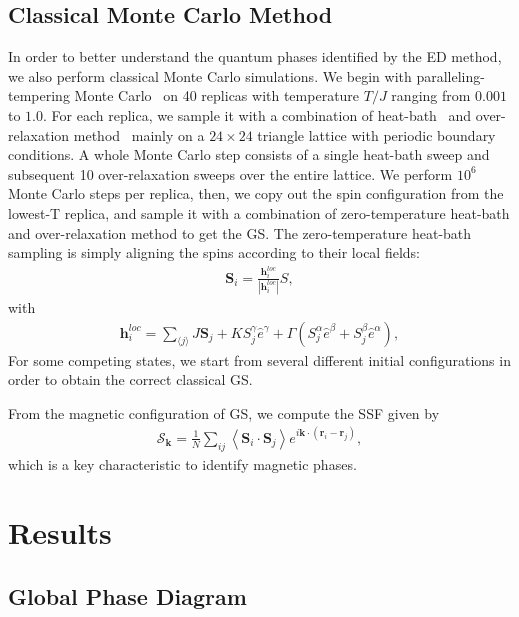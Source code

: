 \documentclass[aps,prb,reprint,amsfonts,amsmath,amssymb,showpacs,groupedaddress,superscriptaddress]{revtex4-1}
\begin{document}
\subsection{\label{subsec:MethodMC}Classical Monte Carlo Method}

In order to better understand the quantum phases identified by the ED method, we also perform classical Monte Carlo simulations. We begin with paralleling-tempering Monte Carlo~\cite{Hukushima96} on 40 replicas with temperature $T/J$ ranging from $0.001$ to $1.0$. For each replica, we sample it with a combination of heat-bath~\cite{Miyatake84} and over-relaxation method~\cite{Berg} mainly on a $24 \times 24$ triangle lattice with periodic boundary conditions. A whole Monte Carlo step consists of a single heat-bath sweep and subsequent 10 over-relaxation sweeps over the entire lattice. We perform $10^6$ Monte Carlo steps per replica, then, we copy out the spin configuration from the lowest-T replica, and sample it with a combination of zero-temperature heat-bath and over-relaxation method to get the GS. The zero-temperature heat-bath sampling is simply aligning the spins according to their local fields:
\begin{align}
    \bm{S}_{i} = \frac{\bm{h}_{i}^{loc}}{|\bm{h}_{i}^{loc}|} S,
\end{align}
with
\begin{align}
    \bm{h}_{i}^{loc} = \sum_{\langle j \rangle} J \bm{S}_{j} + K {S}^{\gamma}_{j} \hat{e}^{\gamma} + \Gamma (S^{\alpha}_{j} \hat{e}^{\beta} + S^{\beta}_{j} \hat{e}^{\alpha}),
\end{align}
For some competing states, we start from several different initial configurations in order to obtain the correct classical GS.

From the magnetic configuration of GS, we compute the SSF given by
\begin{align}
    \mathcal{S}_{\bm{k}} = \frac{1}{N} \sum_{ij} \left \langle \bm{S}_i \cdot \bm{S}_j \right \rangle e^{i \bm{k} \cdot (\bm{r}_i-\bm{r}_j)},
\end{align}
which is a key characteristic to identify magnetic phases.

\section{\label{sec:Results}Results}

\subsection{\label{subsec:GlobalPhaseDiagram}Global Phase Diagram}
\end{document}
